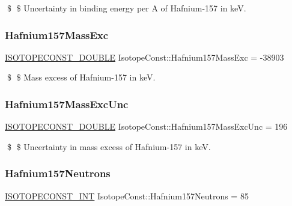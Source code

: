 \$ \$ Uncertainty in binding energy per A of Hafnium-\/157 in keV. \mbox{\label{group___isotope_const-_hafnium-_hf157_ga59076c0a175196e11368f12f6725a62e}} 
\subsubsection{\texorpdfstring{Hafnium157\+Mass\+Exc}{Hafnium157MassExc}}
{\footnotesize\ttfamily \mbox{\hyperlink{group___isotope_const-_macros_ga8f45a7272ce02c0b4c65c44636ed719a}{I\+S\+O\+T\+O\+P\+E\+C\+O\+N\+S\+T\+\_\+\+D\+O\+U\+B\+LE}} Isotope\+Const\+::\+Hafnium157\+Mass\+Exc = -\/38903}

\$ \$ Mass excess of Hafnium-\/157 in keV. \mbox{\label{group___isotope_const-_hafnium-_hf157_gaf3812f948d065a57d789c9e6fe97e766}} 
\subsubsection{\texorpdfstring{Hafnium157\+Mass\+Exc\+Unc}{Hafnium157MassExcUnc}}
{\footnotesize\ttfamily \mbox{\hyperlink{group___isotope_const-_macros_ga8f45a7272ce02c0b4c65c44636ed719a}{I\+S\+O\+T\+O\+P\+E\+C\+O\+N\+S\+T\+\_\+\+D\+O\+U\+B\+LE}} Isotope\+Const\+::\+Hafnium157\+Mass\+Exc\+Unc = 196}

\$ \$ Uncertainty in mass excess of Hafnium-\/157 in keV. \mbox{\label{group___isotope_const-_hafnium-_hf157_ga3ffb6a9311e1459bdc076231ec0cc44f}} 
\subsubsection{\texorpdfstring{Hafnium157\+Neutrons}{Hafnium157Neutrons}}
{\footnotesize\ttfamily \mbox{\hyperlink{group___isotope_const-_macros_ga5f18360b3e99483a35c32d789e62621c}{I\+S\+O\+T\+O\+P\+E\+C\+O\+N\+S\+T\+\_\+\+I\+NT}} Isotope\+Const\+::\+Hafnium157\+Neutrons = 85}

